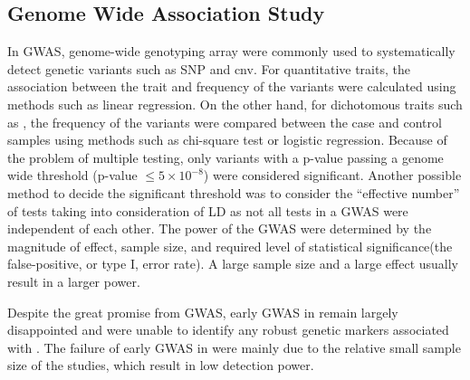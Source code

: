 \documentclass[12pt]{book}
\newcommand*{\glng}{\glsentrylong}
\begin{document}
	\subsection{Genome Wide Association Study}
	In \gls{GWAS}, genome-wide genotyping array were commonly used to systematically detect genetic variants such as \gls{SNP} and \gls{cnv}.
	For quantitative traits, the association between the trait and frequency of the variants were calculated using methods such as linear regression.
	On the other hand, for dichotomous traits such as \glng{scz}, the frequency of the variants were compared between the case and control samples using methods such as chi-square test or logistic regression.
	Because of the problem of multiple testing, only variants with a p-value passing a genome wide threshold (p-value $\le5\times10^{-8}$) were considered significant.
	Another possible method to decide the significant threshold was to consider the ``effective number'' of tests\citep{Li2011} taking into consideration of \gls{LD} as not all tests in a \gls{GWAS} were independent of each other. 
	The power of the \gls{GWAS} were determined by the magnitude of effect, sample size, and required level of statistical significance(the false-positive, or type I, error rate)\citep{Purcell2003}.
	A large sample size and a large effect usually result in a larger power.
	
	Despite the great promise from \gls{GWAS}, early \gls{GWAS} in \glng{scz} remain largely disappointed and were unable to identify any robust genetic markers associated with \glng{scz}.
	The failure of early \gls{GWAS} in \glng{scz} were mainly due to the relative small sample size of the studies, which result in low detection power.
	
\end{document}
